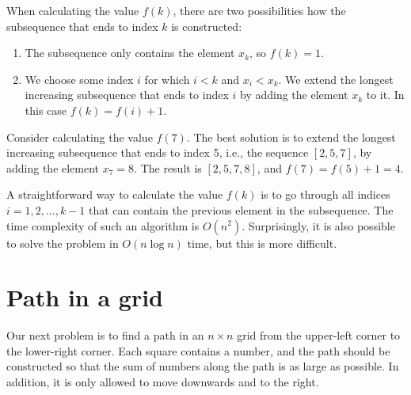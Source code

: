 When calculating the value $f(k)$,
there are two possibilities how the subsequence
that ends to index $k$ is constructed:
\begin{enumerate}
\item The subsequence
only contains the element $x_k$, so $f(k)=1$.
\item We choose some index $i$ for which $i<k$
and $x_i<x_k$.
We extend the longest increasing subsequence
that ends to index $i$ by adding the element $x_k$
to it. In this case $f(k)=f(i)+1$.
\end{enumerate}

Consider calculating the value $f(7)$.
The best solution is to extend the longest
increasing subsequence that ends to index 5,
i.e., the sequence $[2,5,7]$, by adding
the element $x_7=8$.
The result is
$[2,5,7,8]$, and $f(7)=f(5)+1=4$.

A straightforward way to calculate the
value $f(k)$ is to
go through all indices
$i=1,2,\ldots,k-1$ that can contain the
previous element in the subsequence.
The time complexity of such an algorithm is $O(n^2)$.
Surprisingly, it is also possible to solve the
problem in $O(n \log n)$ time, but this is more difficult.

\section{Path in a grid}

Our next problem is to find a path
in an $n \times n$ grid
from the upper-left corner to
the lower-right corner.
Each square contains a number,
and the path should be constructed so
that the sum of numbers along
the path is as large as possible.
In addition, it is only allowed to move
downwards and to the right.

